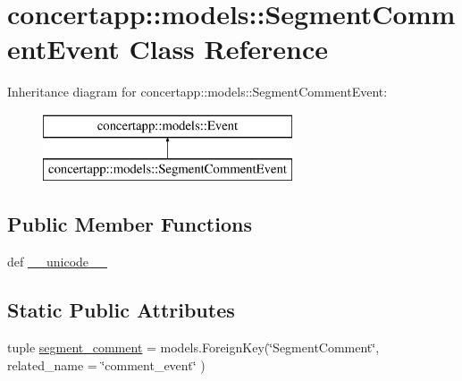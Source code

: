 \hypertarget{classconcertapp_1_1models_1_1_segment_comment_event}{
\section{concertapp::models::SegmentCommentEvent Class Reference}
\label{classconcertapp_1_1models_1_1_segment_comment_event}
}
Inheritance diagram for concertapp::models::SegmentCommentEvent:\begin{figure}[H]
\begin{center}
\leavevmode
\includegraphics[height=2.000000cm]{classconcertapp_1_1models_1_1_segment_comment_event}
\end{center}
\end{figure}
\subsection*{Public Member Functions}
\begin{DoxyCompactItemize}
\item 
def \hyperlink{classconcertapp_1_1models_1_1_segment_comment_event_a920d7afac1b4012033b6c9d399d2a2c5}{\_\-\_\-unicode\_\-\_\-}
\end{DoxyCompactItemize}
\subsection*{Static Public Attributes}
\begin{DoxyCompactItemize}
\item 
tuple \hyperlink{classconcertapp_1_1models_1_1_segment_comment_event_a1e0d57512039c947d1190cdc9d9e8814}{segment\_\-comment} = models.ForeignKey(\char`\"{}SegmentComment\char`\"{}, related\_\-name = \char`\"{}comment\_\-event\char`\"{} )
\end{DoxyCompactItemize}


